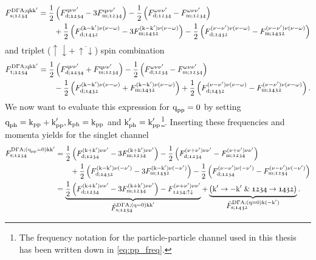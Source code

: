 \documentclass[../../main.tex]{subfiles}
\begin{document}
\begin{align}
\begin{split}
	F_{\text{s};\mathfrak{1234}}^{\text{D}\Gamma\text{A};\text{q}\text{k}\text{k}'}&=\frac12\left (F_{\text{d};\mathfrak{1234}}^{\text{q}\nu\nu'}-3F_{\text{m};\mathfrak{1234}}^{\text{q}\nu\nu'}\right )-\frac12\left (F_{\text{d};\mathfrak{1234}}^{\omega\nu\nu'}-F_{\text{m};\mathfrak{1234}}^{\omega\nu\nu'}\right )\\
	&\qquad+\frac12\left (F_{\text{d};\mathfrak{1432}}^{(\text{k}-\text{k}')\nu(\nu-\omega)}-3F_{\text{m};\mathfrak{1432}}^{(\text{k}-\text{k}')\nu(\nu-\omega)}\right )-\frac12\left (F_{\text{d};\mathfrak{1432}}^{(\nu-\nu')\nu(\nu-\omega)}-F_{\text{m};\mathfrak{1432}}^{(\nu-\nu')\nu(\nu-\omega)}\right )
\end{split}
\end{align}
and triplet ($\uparrow\downarrow+\,\overline{\uparrow\downarrow}$) spin combination
\begin{align}
\begin{split}
	F_{\text{t};\mathfrak{1234}}^{\text{D}\Gamma\text{A};\text{q}\text{k}\text{k}'}&=\frac12\left (F_{\text{d};\mathfrak{1234}}^{\text{q}\nu\nu'}+F_{\text{m};\mathfrak{1234}}^{\text{q}\nu\nu'}\right )-\frac12\left (F_{\text{d};\mathfrak{1234}}^{\omega\nu\nu'}-F_{\text{m};\mathfrak{1234}}^{\omega\nu\nu'}\right )\\
	&\qquad-\frac12\left (F_{\text{d};\mathfrak{1432}}^{(\text{k}-\text{k}')\nu(\nu-\omega)}+F_{\text{m};\mathfrak{1432}}^{(\text{k}-\text{k}')\nu(\nu-\omega)}\right )+\frac12\left (F_{\text{d};\mathfrak{1432}}^{(\nu-\nu')\nu(\nu-\omega)}-F_{\text{m};\mathfrak{1432}}^{(\nu-\nu')\nu(\nu-\omega)}\right ).
\end{split}
\end{align}
We now want to evaluate this expression for $\text{q}_{\text{pp}}=0$ by setting $\text{q}_{\text{ph}}=\text{k}_{\text{pp}}+\text{k}'_{\text{pp}}, \text{k}_{\text{ph}}=\text{k}_{\text{pp}}$ and $\text{k}'_{\text{ph}}=\text{k}'_{\text{pp}}$\footnote{The frequency notation for the particle-particle channel used in this thesis has been written down in \eqref{eq:pp_freq}.}. Inserting these frequencies and momenta yields for the singlet channel
\begin{align}\label{eq:ladder_f_sing}
\begin{split}
	F_{\text{s};\mathfrak{1234}}^{\text{D}\Gamma\text{A};(\text{q}_{\text{pp}}=0)\text{k}\text{k}'}&=\frac12\left (F_{\text{d};\mathfrak{1234}}^{(\text{k}+\text{k}')\nu\nu'}-3F_{\text{m};\mathfrak{1234}}^{(\text{k}+\text{k}')\nu\nu'}\right )-\frac12\left (F_{\text{d};\mathfrak{1234}}^{(\nu+\nu')\nu\nu'}-F_{\text{m};\mathfrak{1234}}^{(\nu+\nu')\nu\nu'}\right )\\
	&\qquad+\frac12\left (F_{\text{d};\mathfrak{1432}}^{(\text{k}-\text{k}')\nu(-\nu')}-3F_{\text{m};\mathfrak{1432}}^{(\text{k}-\text{k}')\nu(-\nu')}\right )-\frac12\left (F_{\text{d};\mathfrak{1234}}^{(\nu-\nu')\nu(-\nu')}-F_{\text{m};\mathfrak{1234}}^{(\nu-\nu')\nu(-\nu')}\right )\\
	&=\underbrace{\frac12\left (F_{\text{d};\mathfrak{1234}}^{(\text{k}+\text{k}')\nu\nu'}-3F_{\text{m};\mathfrak{1234}}^{(\text{k}+\text{k}')\nu\nu'}\right )-F_{\mathfrak{1234};\uparrow\downarrow}^{(\nu+\nu')\nu\nu'}}_{\textstyle\tilde{F}_{\text{s};\mathfrak{1234}}^{\text{D}\Gamma\text{A};(\text{q}=0)\text{k}\text{k}'}}+ \underbrace{\left (\text{k}'\rightarrow -\text{k}'\;\&\; \mathfrak{1234}\rightarrow\mathfrak{1432}\right )}_{\textstyle\tilde{F}_{\text{s};\mathfrak{1432}}^{\text{D}\Gamma\text{A};(\text{q}=0)\text{k}(-\text{k}')}}.
\end{split}
\end{align}
\end{document}
